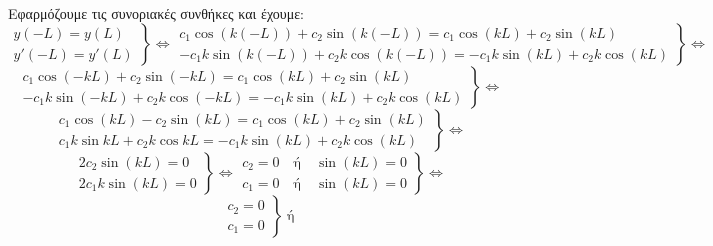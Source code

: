 \begin{solution}
\begin{myitemize}
\begin{align*}
      \end{align*}
      Εφαρμόζουμε τις συνοριακές συνθήκες και έχουμε:
      \[
        \left.
          \begin{matrix}
            y(-L)=y(L) \\
            y'(-L)=y'(L)
          \end{matrix} 
        \right\} \Leftrightarrow 
        \left.
          \begin{matrix}
            c_{1} \cos{(k(-L))} + c_{2} \sin{(k(-L))} = c_{1} \cos{(kL)} + 
            c_{2} \sin{(kL)} \\
            - c_{1} k \sin{(k(-L))} + c_{2} k \cos{(k(-L))} = - c_{1}k \sin{(kL)} + 
            c_{2} k\cos{(kL)}
          \end{matrix} 
        \right\} \Leftrightarrow 
      \]
      \[
        \left.
          \begin{matrix}
            c_{1} \cos{(-kL)} + c_{2} \sin{(-kL)} = c_{1} \cos{(kL)} + c_{2} 
            \sin{(kL)} \\
            - c_{1} k \sin{(-kL)} + c_{2} k \cos{(-kL)} = - c_{1}k \sin{(kL)} + 
            c_{2} k\cos{(kL)}
          \end{matrix} 
        \right\} \Leftrightarrow 
      \]
      \[
        \left.
          \begin{matrix}
            c_{1} \cos{(kL)} - c_{2} \sin{(kL)} = c_{1} \cos{(kL)} + c_{2} \sin{(kL)} \\
            c_{1} k \sin{kL} + c_{2} k \cos{kL} = - c_{1}k \sin{(kL)} + c_{2} k\cos{(kL)}
          \end{matrix}
        \right\} \Leftrightarrow 
      \]
      \[
        \left.
          \begin{matrix}
            2 c_{2} \sin{(kL)} = 0 \\
            2 c_{1} k \sin{(kL)} = 0
          \end{matrix} 
        \right\} \Leftrightarrow 
        \left.
          \begin{matrix}
            c_{2} = 0 \quad \text{ή} \quad \sin{(kL)} = 0 \\
            c_{1} = 0 \quad \text{ή} \quad \sin{(kL)} = 0
          \end{matrix} 
        \right\} \Leftrightarrow 
      \]
      \[
        \left.
          \begin{matrix}
            c_{2} = 0 \\
            c_{1} = 0
          \end{matrix} 
        \right\} \; \text{ή} \; 
\]
\end{myitemize}
\end{solution}
